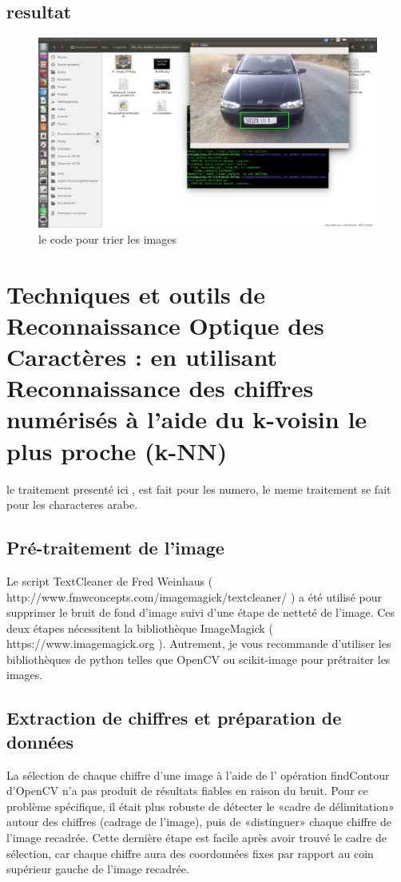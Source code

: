 \documentclass[11pt]{report}
\begin{document}
\subsection*{resultat}
\begin{figure}[H]
	\begin{center}
		\includegraphics[width=12cm]{images/matriculedetected.png}
		\caption{le code pour trier les images}
		\label{fig:figure}
	\end{center}
\end{figure}
\section{Techniques et outils de Reconnaissance Optique des Caractères
	: en utilisant Reconnaissance des chiffres numérisés à l'aide du k-voisin le plus proche (k-NN)}
le traitement presenté ici , est fait pour les numero, le meme traitement se fait pour les characteres arabe.

\subsection{Pré-traitement de l'image}
Le script TextCleaner de Fred Weinhaus ( http://www.fmwconcepts.com/imagemagick/textcleaner/ ) a été utilisé pour supprimer le bruit de fond d’image suivi d’une étape de netteté de l’image. Ces deux étapes nécessitent la bibliothèque ImageMagick ( https://www.imagemagick.org ). Autrement, je vous recommande d'utiliser les bibliothèques de python telles que OpenCV ou scikit-image pour prétraiter les images.

\subsection{Extraction de chiffres et préparation de données}
La sélection de chaque chiffre d'une image à l'aide de l' opération findContour d'OpenCV n'a pas produit de résultats fiables en raison du bruit. Pour ce problème spécifique, il était plus robuste de détecter le «cadre de délimitation» autour des chiffres (cadrage de l'image), puis de «distinguer» chaque chiffre de l'image recadrée. Cette dernière étape est facile après avoir trouvé le cadre de sélection, car chaque chiffre aura des coordonnées fixes par rapport au coin supérieur gauche de l’image recadrée.
\end{document}
